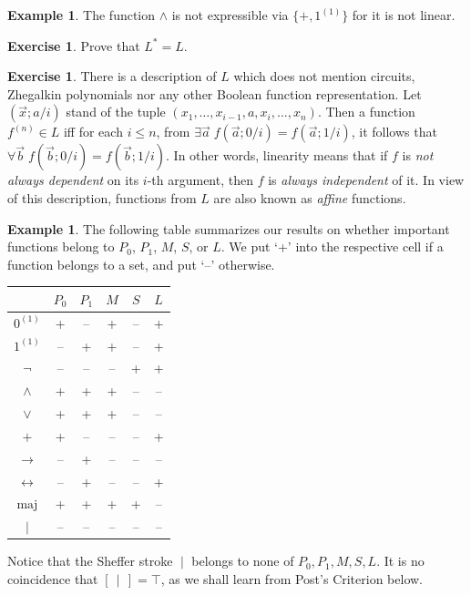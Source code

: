 \documentclass[12pt,notitlepage]{article}
\theoremstyle{plain}
\theoremstyle{definition}
\newtheorem{exc}[thm]{Exercise}
\newtheorem{exm}[thm]{Example}
\theoremstyle{plain}
\newcommand{\1}{\mathbf{1}}
\newcommand{\0}{\mathbf{0}}
\newcommand{\dvd}{\mathop{\mid}}
\begin{document}
\begin{exm}
The function $\wedge$ is not expressible via $\{{+}, 1^{(1)}\}$ for it is not linear.
\end{exm}

\begin{exc}
Prove that $L^* = L$.
\end{exc}

\begin{exc}
There is a description of $L$ which does not mention circuits, Zhegalkin polynomials nor any other Boolean function representation. Let $(\vec x; a/i)$ stand of the tuple $(x_1,\ldots,x_{i-1},a, x_i,\ldots, x_n)$. Then a function $f^{(n)} \in L$ iff for each $i \leq n$,
from $\exists \vec a\; f(\vec a; 0/i) = f(\vec a; 1/i)$, it follows that $\forall \vec b\; f(\vec b; 0/i) = f(\vec b; 1/i)$. In other words, linearity means that if $f$ is \emph{not always dependent} on its $i$-th argument, then $f$ is \emph{always independent} of it. In view of this description, functions from $L$ are also known as \emph{affine} functions.
\end{exc}

\medskip

\begin{exm}\label{bool:in_clones}
The following table summarizes our results on whether important functions belong to $P_0$, $P_1$, $M$, $S$, or $L$. We put `+' into the respective cell if a function belongs to a set, and put `--' otherwise. 
\begin{center}
{\large
\begin{tabular}{|c|c|c|c|c|c|}
\hline
&$P_0$ & $P_1$ & $M$ & $S$ & $L$\\
\hline
$0^{(1)}$&+&--&+&--&+\\
\hline
$1^{(1)}$&--&+&+&--&+\\
\hline
$\neg$&--&--&--&+&+\\
\hline
$\wedge$&+&+&+&--&--\\
\hline
$\vee$&+&+&+&--&--\\
\hline
$+$&+&--&--&--&+\\
\hline
$\to$&--&+&--&--&--\\
\hline
$\leftrightarrow$&--&+&--&--&+\\
\hline
$\mathrm{maj}$&+&+&+&+&--\\
\hline
$\dvd$&--&--&--&--&--\\
\hline
\end{tabular}
}
\end{center}
Notice that the Sheffer stroke ${\dvd}$ belongs to none of $P_0, P_1, M, S, L$. It is no coincidence that $[\,{\dvd}\,] = \top$, as we shall learn from Post's Criterion below.
\end{exm}
\end{document}
